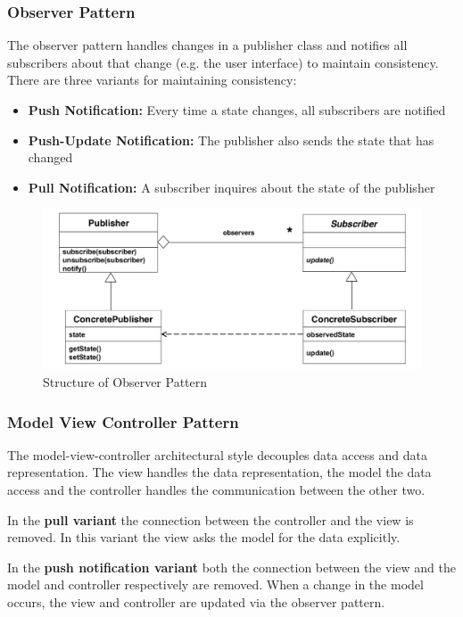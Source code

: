 \subsubsection{Observer Pattern}
The observer pattern handles changes in a publisher class and notifies all subscribers about that change (e.g. the user interface) to maintain consistency.
There are three variants for maintaining consistency:
\begin{itemize}
  \item \textbf{Push Notification:} Every time a state changes, all subscribers are notified
  \item \textbf{Push-Update Notification:} The publisher also sends the state that has changed
  \item \textbf{Pull Notification:} A subscriber inquires about the state of the publisher
\end{itemize}

\begin{figure}[h]
	\centering
	\includegraphics[width=\linewidth]{images/pattern_observer.png}
	\caption{Structure of Observer Pattern}
\end{figure}
\newpage

\subsubsection{Model View Controller Pattern}
The model-view-controller architectural style decouples data access and data representation.
The view handles the data representation, the model the data access and the controller handles the communication between the other two.\newline

In the \textbf{pull variant} the connection between the controller and the view is removed.
In this variant the view asks the model for the data explicitly.

In the \textbf{push notification variant} both the connection between the view and the model and controller respectively are removed.
When a change in the model occurs, the view and controller are updated via the observer pattern.

